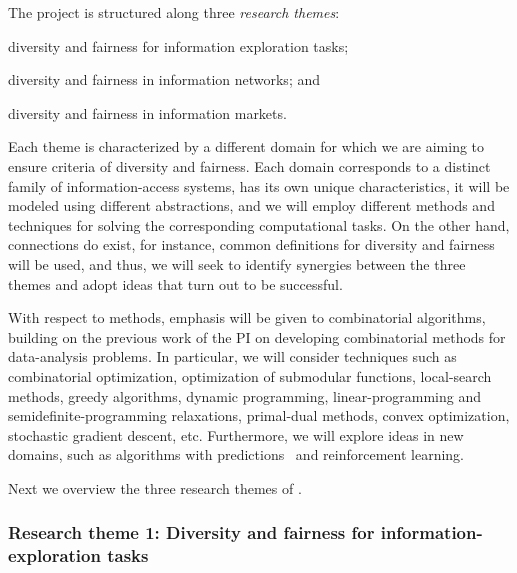 \documentclass[a4paper,11pt]{article}
\begin{document}
The project is structured along three {\em research themes}:
\vspace{-1mm}
\begin{description}
\setlength{\itemsep}{-4pt}
\item[{\exploration}\,:] 
diversity and fairness for information exploration tasks;
\item[{\networks}\,:]
diversity and fairness in information networks; and 
\item[{\markets}\,:]
diversity and fairness in information markets.
\end{description}
\vspace{-1mm}
\iffalse
\emph{diversity and fairness for information exploration tasks} (\exploration), 
\emph{diversity and fairness in information networks} (\networks), 
\emph{diversity and fairness in information markets} (\markets), 
\fi
Each theme is characterized by a different domain
for which we are aiming to ensure criteria of diversity and fairness. 
Each domain corresponds to a distinct family of information-access systems, 
has its own unique characteristics, 
it will be modeled using different abstractions, 
and we will employ different methods and techniques for solving the corresponding 
computational tasks. 
On the other hand, connections do exist, 
for instance, common definitions for diversity and fairness will be used, 
and thus, we will seek to identify synergies between the three themes
and adopt ideas that turn out to be successful.

With respect to methods, 
emphasis will be given to combinatorial algorithms,
building on the previous work of the PI 
on developing combinatorial methods for data-analysis problems.
In particular, we will consider techniques such as 
combinatorial optimization, 
optimization of submodular functions, 
local-search methods, 
greedy algorithms, 
dynamic pro\-gram\-ming, 
linear-pro\-gram\-ming and semi\-def\-ini\-te-pro\-gram\-ming relaxations, 
primal-dual methods, convex optimization,
stochastic gradient descent, etc. 
Furthermore, we will explore ideas in new domains, 
such as 
algorithms with predictions~\cite{mitzenmacher2022algorithms} and
reinforcement learning.

Next we overview the three research themes of \acronym.


\subsubsection*{Research theme 1: Diversity and fairness for information-exploration tasks}
\end{document}
